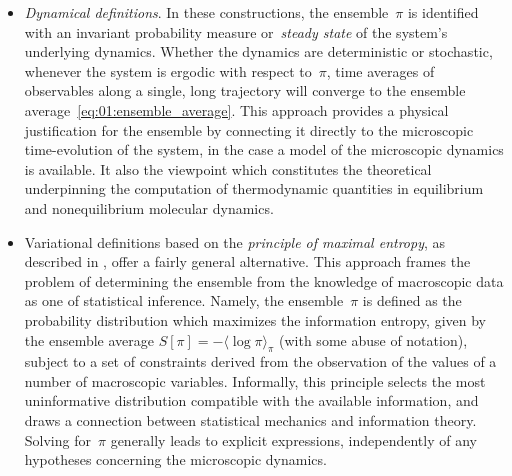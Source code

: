 \begin{itemize}
    \item{\textit{Dynamical definitions}. In these constructions, the ensemble~$\pi$ is identified with an invariant probability measure or~\textit{steady state} of the system's underlying dynamics.
    Whether the dynamics are deterministic or stochastic, whenever the system is ergodic with respect to~$\pi$, time averages of observables along a single, long trajectory will converge to the ensemble average~\eqref{eq:01:ensemble_average}.
    This approach provides a physical justification for the ensemble by connecting it directly to the microscopic time-evolution of the system, in the case a model of the microscopic dynamics is available.
    It also the viewpoint which constitutes the theoretical underpinning the computation of thermodynamic quantities in equilibrium and nonequilibrium molecular dynamics.
    }
    \item{Variational definitions based on the \textit{principle of maximal entropy}, as described in \cite{J57a,J57b}, offer a fairly general alternative.
    This approach frames the problem of determining the ensemble from the knowledge of macroscopic data as one of statistical inference.
    Namely, the ensemble~$\pi$ is defined as the probability distribution which maximizes the information entropy, given by the ensemble average $S[\pi] = -\langle\log\pi\rangle_\pi$ (with some abuse of notation), subject to a set of constraints derived from the observation of the values of a number of macroscopic variables.
    Informally, this principle selects the most uninformative distribution compatible with the available information, and draws a connection between statistical mechanics and information theory. Solving for~$\pi$ generally leads to explicit expressions, independently of any hypotheses concerning the microscopic dynamics.}
\end{itemize}

